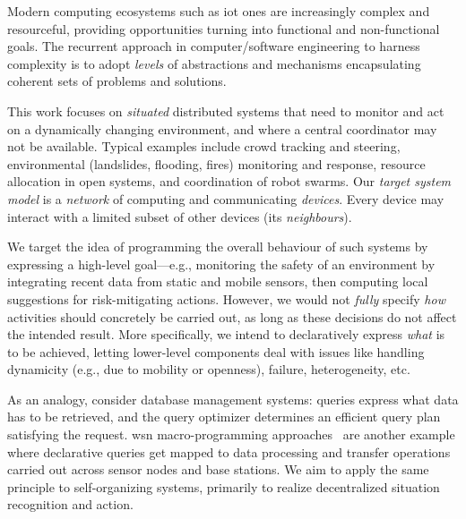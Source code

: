 Modern computing ecosystems
 such as \ac{iot} ones
 are increasingly complex
 and resourceful,
 providing opportunities
 turning into functional and non-functional goals.
%
The recurrent approach in computer/software engineering to harness 
 complexity
 is to adopt \emph{levels} of abstractions and mechanisms
 encapsulating coherent sets of problems and solutions.

This work focuses on \emph{situated} distributed systems
that need to monitor and act on a dynamically
changing environment,
and where a central coordinator
may not be available.
%
Typical examples %
include 
crowd tracking and steering,
environmental (landslides, flooding, fires) monitoring and response,
resource allocation in open systems,
and coordination of robot swarms. %
%
Our \emph{target system model} is a \emph{network} of computing and communicating \emph{devices}.
%
Every device %
 may interact with a limited subset of other devices (its \emph{neighbours}).
%

We target the idea of programming the overall behaviour
of such systems 
by expressing a high-level goal---e.g.,
monitoring the safety of an environment by integrating recent data from static and mobile sensors,
then computing local suggestions for risk-mitigating actions.
%
However, we would not \emph{fully} specify \emph{how} activities should concretely be carried out,
as long as these decisions do not affect the intended result.
%
More specifically, we intend to declaratively express
\emph{what} is to be achieved,
letting lower-level components 
 deal with %
 issues like
 handling dynamicity (e.g., due to mobility or openness),
 failure,
 heterogeneity, etc.


As an analogy, consider database management systems: %
 queries express what data has to be retrieved,
 and the query optimizer determines an efficient query plan satisfying the request.
%
%
\Ac{wsn} macro-programming approaches~\cite{DBLP:journals/csur/MottolaP11} are another example
where declarative queries get mapped to data processing and transfer operations
carried out across sensor nodes and base stations.
%
We aim to apply the same principle to self-organizing systems,
primarily to realize decentralized situation recognition and action.


